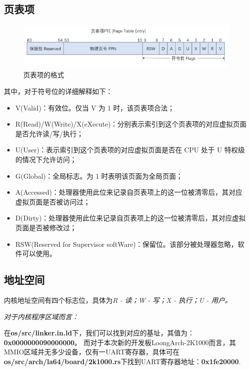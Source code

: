 \subsection{页表项}

\begin{figure}[h]
    \centering
    \includegraphics[width=1\linewidth]{figs/PTE.PNG}
    \caption{页表项的格式}
    \label{P}
\end{figure}

其中，对于符号位的详细解释如下：
\begin{itemize}
    \item V(Valid)：有效位。仅当 V 为 1 时，该页表项合法；
    \item R(Read)/W(Write)/X(eXecute)：分别表示索引到这个页表项的对应虚拟页面是否允许读/写/执行；
    \item U(User)：表示索引到这个页表项的对应虚拟页面是否在 CPU 处于 U 特权级的情况下允许访问；
    \item G(Global)：全局标志。为 1 时表明该页面为全局页面；
    \item A(Accessed)：处理器使用此位来记录自页表项上的这一位被清零后，其对应虚拟页面是否被访问过；
    \item D(Dirty)：处理器使用此位来记录自页表项上的这一位被清零后，其对应虚拟页面是否被修改过；
    \item RSW(Reserved for Supervisor softWare)：保留位。该部分被处理器忽略，软件可以使用。
\end{itemize}

\subsection{地址空间}
内核地址空间有四个标志位，具体为\textit{R - 读；W - 写；X - 执行；U - 用户。}

\textit{对于内核程序区域而言：}

在\textbf{os/src/linker.in.ld}下，我们可以找到对应的基址，其值为：\textbf{0x0000000090000000}。
而对于本次新的开发板LoongArch-2K1000而言，其MMIO区域并无多少设备，仅有一UART寄存器，具体可在\textbf{os/src/arch/la64/board/2k1000.rs}下找到UART寄存器地址：\textbf{0x1fe20000}.


